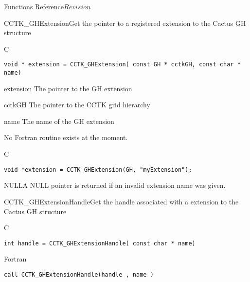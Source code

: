 \begin{cactuspart}{ Functions Reference}{}{$Revision$}
\begin{FunctionDescription}{CCTK\_GHExtension}{Get the pointer to a registered extension to the Cactus GH structure}
\label{CCTK-GHExtension}
\begin{SynopsisSection}
\begin{Synopsis}{C}
\begin{verbatim}void * extension = CCTK_GHExtension( const GH * cctkGH, const char * name)\end{verbatim}
\end{Synopsis}
\end{SynopsisSection}
\begin{ParameterSection}
\begin{Parameter}{extension}
The pointer to the GH extension
\end{Parameter}
\begin{Parameter}{cctkGH}
The pointer to the CCTK grid hierarchy
\end{Parameter}
\begin{Parameter}{name}
The name of the GH extension
\end{Parameter}
\end{ParameterSection}
\begin{Discussion}
No Fortran routine exists at the moment.
\end{Discussion}
\begin{ExampleSection}
\begin{Example}{C}
\begin{verbatim}
void *extension = CCTK_GHExtension(GH, "myExtension");
\end{verbatim}
\end{Example}
\end{ExampleSection}
\begin{ErrorSection}
\begin{Error}{NULL}A NULL pointer is returned if an invalid extension name was given.\end{Error}
\end{ErrorSection}
\end{FunctionDescription}

\begin{FunctionDescription}{CCTK\_GHExtensionHandle}{Get the handle associated with a extension to the Cactus GH structure}
\label{CCTK-GHExtensionHandle}
\begin{SynopsisSection}
\begin{Synopsis}{C}
\begin{verbatim}int handle = CCTK_GHExtensionHandle( const char * name)\end{verbatim}
\end{Synopsis}
\begin{Synopsis}{Fortran}
\begin{verbatim}call CCTK_GHExtensionHandle(handle , name )


\end{verbatim}
\end{Synopsis}
\end{SynopsisSection}
\end{FunctionDescription}
\end{cactuspart}

